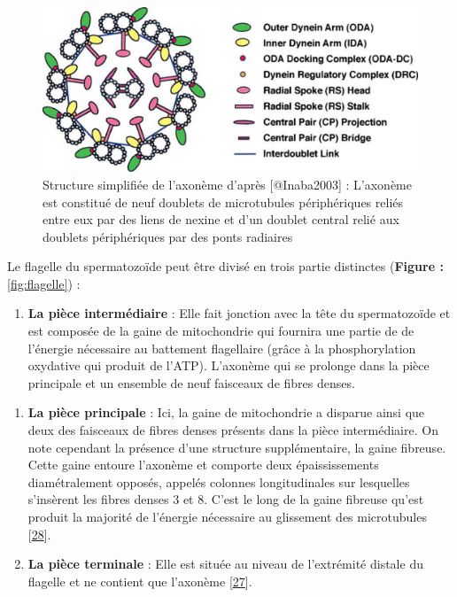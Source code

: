 \documentclass[12pt,twoside]{reedthesis}
\providecommand{\tightlist}{%
  \setlength{\itemsep}{0pt}\setlength{\parskip}{0pt}}
\theoremstyle{definition}
\theoremstyle{definition}
\theoremstyle{remark}
\begin{document}
  \begin{figure}
  
  {\centering \includegraphics[scale=.3]{figure/axoneme} 
  
  }
  
  \caption[Structure simplifiée de l'axonème]{Structure simplifiée de l'axonème d'après [@Inaba2003] : L'axonème est constitué de neuf doublets de microtubules périphériques reliés entre eux par des liens de nexine et d'un doublet central relié aux doublets périphériques par des ponts radiaires}\label{fig:axoneme}
  \end{figure}
  
  Le flagelle du spermatozoïde peut être divisé en trois partie distinctes
  (\textbf{Figure : }\ref{fig:flagelle}) :
  
  \begin{enumerate}
  \def\labelenumi{\arabic{enumi}.}
  \tightlist
  \item
    \textbf{La pièce intermédiaire} : Elle fait jonction avec la tête du
    spermatozoïde et est composée de la gaine de mitochondrie qui fournira
    une partie de de l'énergie nécessaire au battement flagellaire (grâce
    à la phosphorylation oxydative qui produit de l'ATP). L'axonème qui se
    prolonge dans la pièce principale et un ensemble de neuf faisceaux de
    fibres denses.
  \end{enumerate}
  
  \newpage
  
  \begin{enumerate}
  \def\labelenumi{\arabic{enumi}.}
  \setcounter{enumi}{1}
  \tightlist
  \item
    \textbf{La pièce principale} : Ici, la gaine de mitochondrie a
    disparue ainsi que deux des faisceaux de fibres denses présents dans
    la pièce intermédiaire. On note cependant la présence d'une structure
    supplémentaire, la gaine fibreuse. Cette gaine entoure l'axonème et
    comporte deux épaississements diamétralement opposés, appelés colonnes
    longitudinales sur lesquelles s'insèrent les fibres denses 3 et 8.
    C'est le long de la gaine fibreuse qu'est produit la majorité de
    l'énergie nécessaire au glissement des microtubules
    {[}\protect\hyperlink{ref-Eddy2007}{28}{]}.\\
  \item
    \textbf{La pièce terminale} : Elle est située au niveau de l'extrémité
    distale du flagelle et ne contient que l'axonème
    {[}\protect\hyperlink{ref-Inaba2003}{27}{]}.
  \end{enumerate}
  
\end{document}
